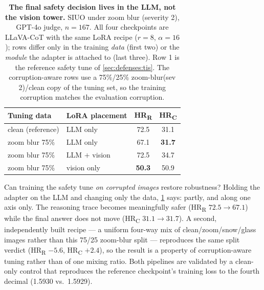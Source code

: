 \begin{table}[t]
  \centering
  \caption{\textbf{The final safety decision lives in the LLM, not the vision tower.} SIUO under zoom blur (severity 2), GPT-4o judge, $n{=}167$. All four checkpoints are LLaVA-CoT with the same LoRA recipe ($r{=}8$, $\alpha{=}16$); rows differ only in the training \emph{data} (first two) or the \emph{module} the adapter is attached to (last three). Row 1 is the reference safety tune of \cref{sec:defenses:tis}. The corruption-aware rows use a 75\%/25\% zoom-blur(sev 2)/clean copy of the tuning set, so the training corruption matches the evaluation corruption.}
  \label{tab:module}
  \small
  \setlength{\tabcolsep}{4pt}
  \begin{tabular}{llcc}
    \toprule
    Tuning data & LoRA placement & HR\textsubscript{R} & HR\textsubscript{C} \\
    \midrule
    clean (reference)     & LLM only      & 72.5 & 31.1 \\
    \midrule
    zoom blur 75\%        & LLM only      & 67.1 & \textbf{31.7} \\
    zoom blur 75\%        & LLM $+$ vision & 72.5 & 34.7 \\
    zoom blur 75\%        & vision only   & \textbf{50.3} & 50.9 \\
    \bottomrule
  \end{tabular}
\end{table}

Can training the safety tune \emph{on corrupted images} restore robustness? Holding the adapter on the LLM and changing only the data, \cref{tab:module} says: partly, and along one axis only. The reasoning trace becomes meaningfully safer (HR\textsubscript{R} $72.5\rightarrow67.1$) while the final answer does not move (HR\textsubscript{C} $31.1\rightarrow31.7$). A second, independently built recipe --- a uniform four-way mix of clean/zoom/snow/glass images rather than this 75/25 zoom-blur split --- reproduces the same split verdict (HR\textsubscript{R} $-5.6$, HR\textsubscript{C} $+2.4$), so the result is a property of corruption-aware tuning rather than of one mixing ratio. Both pipelines are validated by a clean-only control that reproduces the reference checkpoint's training loss to the fourth decimal (1.5930 vs.\ 1.5929).

